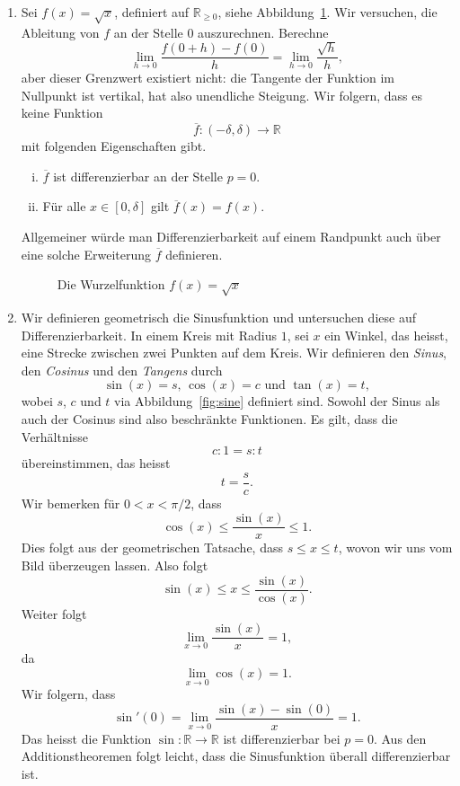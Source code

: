 \documentclass[../main.tex]{subfiles}
\begin{document}
\begin{examples}
  \leavevmode
  \begin{enumerate}[(1)]
    \item Sei $f(x) = \sqrt x$,
      definiert auf $\mathbb{R}_{\geq 0}$,
      siehe Abbildung~\ref{fig:sqrt}.
      Wir versuchen, die Ableitung
      von $f$ an der Stelle $0$ auszurechnen.
      Berechne
      \[
        \lim_{h \to 0} \frac{f(0 + h) - f(0)}{h}
        = \lim_{h \to 0} \frac{\sqrt h}{h},
      \]
      aber dieser Grenzwert existiert nicht: 
      die Tangente der Funktion im Nullpunkt
      ist vertikal, hat also unendliche Steigung.
      Wir folgern, dass es keine Funktion
      \[
      \overline f \colon (- \delta, \delta) \to \mathbb{R}
      \]
      mit folgenden Eigenschaften gibt.
      \begin{enumerate}[(i)]
        \item $\overline f$ ist differenzierbar
          an der Stelle $p = 0$.
        \item Für alle $x \in [0, \delta]$ gilt
          $\overline f (x) = f(x)$.
      \end{enumerate}
      Allgemeiner würde man Differenzierbarkeit auf
      einem Randpunkt auch über eine solche
      Erweiterung $\overline f$ definieren.
      
      \begin{figure}[htb]
        \centering
        
        \caption{Die Wurzelfunktion $f(x) = \sqrt x$}%
        \label{fig:sqrt}
      \end{figure}

    \item Wir definieren geometrisch die Sinusfunktion
      und untersuchen diese auf Differenzierbarkeit.
      In einem Kreis mit Radius $1$, sei $x$ ein Winkel,
      das heisst, eine Strecke zwischen zwei Punkten auf
      dem Kreis.
      Wir definieren den \emph{Sinus},
      den \emph{Cosinus} und den \emph{Tangens} durch
      \[
        \sin(x) = s \text{, } \cos(x) = c \text{ und }
        \tan(x) = t,
      \]
      wobei $s$, $c$ und $t$ via Abbildung~\ref{fig:sine}
      definiert sind.
      Sowohl der Sinus als auch der Cosinus
      sind also beschränkte Funktionen.
      Es gilt, dass die Verhältnisse
      \[
        c : 1 = s : t
      \]
      übereinstimmen, das heisst
      \[
        t = \frac{s}{c}.
      \]
      Wir bemerken für
      $0 < x < \pi/2$, dass
      \[
        \cos(x) \leq \frac{\sin(x)}{x} \leq 1.
      \]
      Dies folgt aus der geometrischen Tatsache,
      dass $s \leq x \leq t$,
      wovon wir uns vom Bild überzeugen lassen.
      Also folgt
      \[
        \sin(x) \leq x \leq \frac{\sin(x)}{\cos(x)}.
      \]
      Weiter folgt
      \[
        \lim_{x \to 0} \frac{\sin(x)}{x} = 1,
      \]
      da 
      \[
        \lim_{x \to 0} \cos(x) = 1.
      \]
      Wir folgern, dass
      \[
        \sin'(0) = 
        \lim_{x \to 0} \frac{\sin(x) - \sin(0)}{x}
        = 1.
      \]
      Das heisst die Funktion 
      $\sin \colon \mathbb{R} \to \mathbb{R}$ ist differenzierbar
      bei $p = 0$.
      Aus den Additionstheoremen folgt leicht,
      dass die Sinusfunktion überall differenzierbar ist.


\end{enumerate}
\end{examples}
\end{document}
